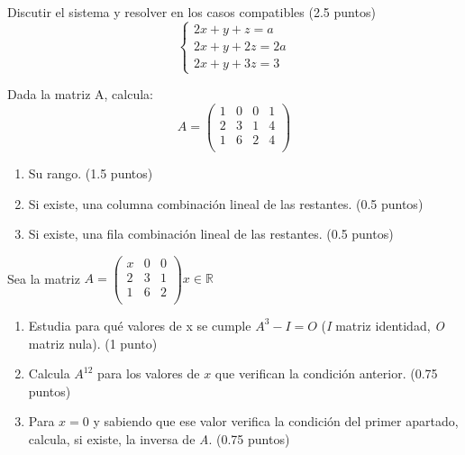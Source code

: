 \documentclass[
]{article}
\author{}
\date{}
\begin{document}
\begin{exercise} Discutir el sistema y resolver en los casos compatibles
(2.5 puntos) \[
\begin{cases}
    2x + y + z  = a\\
    2x + y + 2z = 2a\\
    2x + y + 3z = 3
\end{cases}
\] \end{exercise}

\begin{exercise} Dada la matriz A, calcula: \[A = \begin{pmatrix}
1 & 0 & 0 & 1\\
2 & 3 & 1 & 4\\
1 & 6 & 2 & 4\\
\end{pmatrix}\]

\begin{enumerate}
\def\labelenumi{\alph{enumi})}
\item
  Su rango. (1.5 puntos)
\item
  Si existe, una columna combinación lineal de las restantes. (0.5
  puntos)
\item
  Si existe, una fila combinación lineal de las restantes. (0.5 puntos)
\end{enumerate}

\end{exercise}

\begin{exercise} Sea la matriz
\(A =  \begin{pmatrix}  x & 0 & 0 \\  2 & 3 & 1 \\  1 & 6 & 2 \\  \end{pmatrix} x \in \mathbb{R}\)

\begin{enumerate}
\def\labelenumi{\alph{enumi})}
\item
  Estudia para qué valores de x se cumple \(A^3 - I = O\) (\emph{I}
  matriz identidad, \emph{O} matriz nula). (1 punto)
\item
  Calcula \(A^12\) para los valores de \(x\) que verifican la condición
  anterior. (0.75 puntos)
\item
  Para \(x = 0\) y sabiendo que ese valor verifica la condición del
  primer apartado, calcula, si existe, la inversa de \emph{A}. (0.75
  puntos)
\end{enumerate}

\end{exercise}
\end{document}
